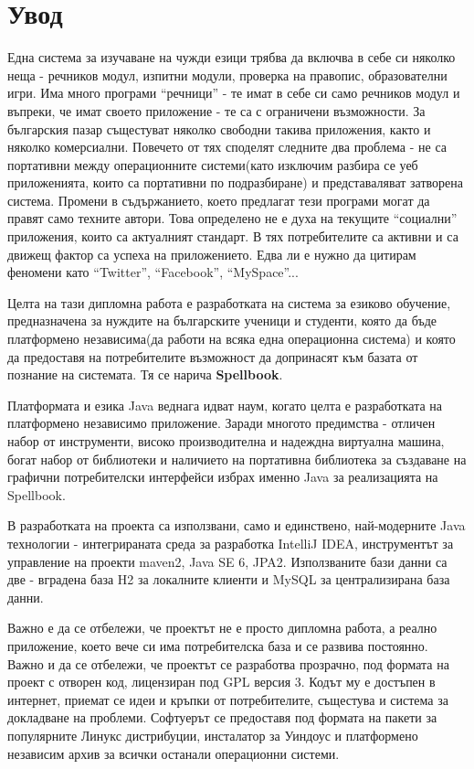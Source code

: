 \chapter{Увод}
Една система за изучаване на чужди езици трябва да включва в себе си
няколко неща - речников модул, изпитни модули, проверка на правопис,
образователни игри. Има много програми "`речници"' - те имат в себе си
само речников модул и въпреки, че имат своето приложение - те са с
ограничени възможности. За българския пазар същестуват няколко
свободни такива приложения, както и няколко комерсиални. Повечето от
тях споделят следните два проблема - не са портативни между
операционните системи(като изключим разбира се уеб приложенията, които
са портативни по подразбиране) и представаляват затворена
система. Промени в съдържанието, което предлагат тези програми могат
да правят само техните автори. Това определено не е духа на текущите
"`социални"' приложения, които са актуалният стандарт. В тях
потребителите са активни и са движещ фактор са успеха на
приложението. Едва ли е нужно да цитирам феномени като "`Twitter"',
"`Facebook"', "`MySpace"'... 

Целта на тази дипломна работа е разработката на система за езиково
обучение, предназначена за нуждите на българските ученици и студенти,
която да бъде платформено независима(да работи на всяка една
операционна система) и която да предоставя на потребителите възможност
да допринасят към базата от познание на системата. Тя се нарича {\bf
  Spellbook}.

Платформата и езика Java веднага идват наум, когато целта е
разработката на платформено независимо приложение. Заради многото
предимства - отличен набор от инструменти, високо производителна и
надеждна виртуална машина, богат набор от библиотеки и наличието на
портативна библиотека за създаване на графични потребителски
интерфейси избрах именно Java за реализацията на Spellbook.

В разработката на проекта са използвани, само и единствено,
най-модерните Java технологии - интегрираната среда за разработка
IntelliJ IDEA, инструментът за управление на проекти maven2, Java SE
6, JPA2. Използваните бази данни са две - вградена база H2 за
локалните клиенти и MySQL за централизирана база данни.

Важно е да се отбележи, че проектът не е просто дипломна работа, а
реално приложение, което вече си има потребителска база и се развива
постоянно. Важно и да се отбележи, че проектът се разработва
прозрачно, под формата на проект с отворен код, лицензиран под GPL
версия 3. Кодът му е достъпен в интернет, приемат се идеи и кръпки от
потребителите, същестува и система за докладване на
проблеми. Софтуерът се предоставя под формата на пакети за популярните
Линукс дистрибуции, инсталатор за Уиндоус и платформено независим
архив за всички останали операционни системи.


